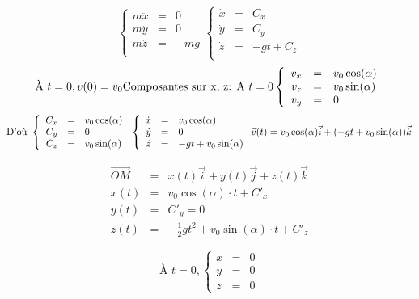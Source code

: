 \[\left\{
		\begin{array}{rcl}
			m\ddot{x} &=& 0 \\
			m\ddot{y} &=& 0 \\
			m\ddot{z} &=& -mg \\
		\end{array}\right.
		\left\{
		\begin{array}{rcl}
			\dot{x} &=& C_x \\
			\dot{y} &=& C_y \\
			\dot{z} &=& -gt + C_z \\
		\end{array}\right.
	\]
	\[\text{À } t=0 , v(0) = v_0 ~\\
	\text{Composantes sur x, z: } ~\\
	\text{A } t = 0 \left\{
		\begin{array}{rcl}
			v_x &=& v_0 \cos(\alpha) \\
			v_z &=& v_0 \sin(\alpha) \\
			v_y &=& 0 \end{array} \right.
		\]
		\[
		\text{D'où } 
		\left\{
		\begin{array}{rcl}
				C_x &=& v_0 \cos(\alpha) \\
				C_y &=& 0 \\
				C_z &=& v_0 \sin(\alpha) \end{array}\right. ~\\
		\left\{ \begin{array}{rcl}
				\dot{x} &=& v_0 \cos (\alpha) \\
				\dot{y} &=& 0 \\
				\dot{z} &=& -gt + v_0 \sin(\alpha) \end{array}\right. ~\\
		\vec{v}(t) = v_0\cos(\alpha)\vec{i} + (-gt+v_0\sin(\alpha))\vec{k}\] 

\[\begin{array}{rcl}
		\overrightarrow{OM} &=& x(t)\vec{i} + y(t) \vec{j} + z(t) \vec{k} \\
		x(t) &=& v_0\cos(\alpha) \cdot t + C'_x \\
		y(t) &=& C'_y = 0 \\
z(t) &=& -\frac{1}{2}gt^2 + v_0 \sin(\alpha)\cdot t + C'_z \end{array}\]

		\[\text{À } t=0,
			\left\{ \begin{array}{rcl}
			x &=& 0 \\
			y &=& 0 \\
			z &=& 0\end{array}\right.\]

